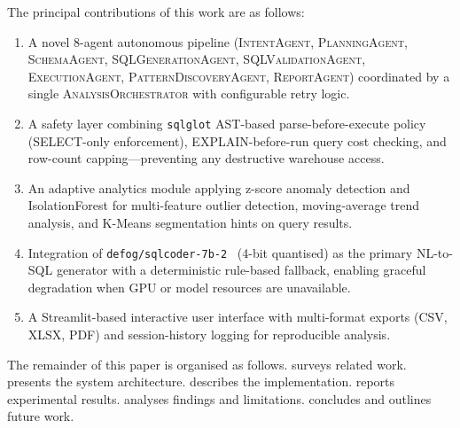 \documentclass[conference]{IEEEtran}
\begin{document}
The principal contributions of this work are as follows:
\begin{enumerate}
  \item A novel 8-agent autonomous pipeline
    (\textsc{IntentAgent}, \textsc{PlanningAgent}, \textsc{SchemaAgent},
    \textsc{SQLGenerationAgent}, \textsc{SQLValidationAgent},
    \textsc{ExecutionAgent}, \textsc{PatternDiscoveryAgent},
    \textsc{ReportAgent}) coordinated by a single
    \textsc{AnalysisOrchestrator} with configurable retry logic.
  \item A safety layer combining \texttt{sqlglot} AST-based
    parse-before-execute policy (SELECT-only enforcement),
    EXPLAIN-before-run query cost checking, and row-count
    capping—preventing any destructive warehouse access.
  \item An adaptive analytics module applying z-score anomaly detection
    and IsolationForest for multi-feature outlier detection,
    moving-average trend analysis, and K-Means segmentation hints
    on query results.
  \item Integration of \texttt{defog/sqlcoder-7b-2}~\cite{TODO:sqlcoder}
    (4-bit quantised) as the primary NL-to-SQL generator with a
    deterministic rule-based fallback, enabling graceful degradation
    when GPU or model resources are unavailable.
  \item A Streamlit-based interactive user interface with multi-format
    exports (CSV, XLSX, PDF) and session-history logging for
    reproducible analysis.
\end{enumerate}


The remainder of this paper is organised as follows.
 surveys related work.
 presents the system architecture.
 describes the implementation.
 reports experimental results.
 analyses findings and limitations.
 concludes and outlines future work.

\end{document}
